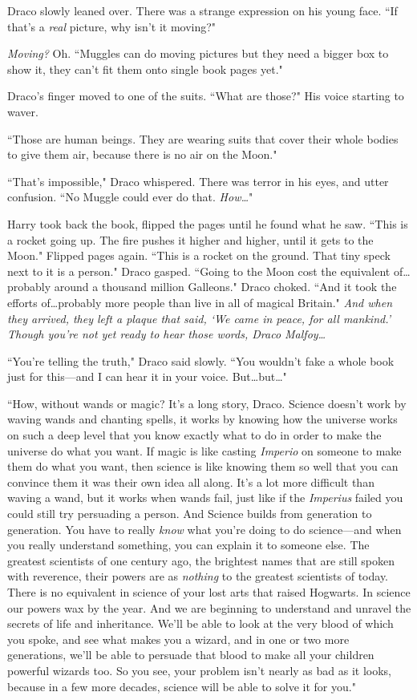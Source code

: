 Draco slowly leaned over. There was a strange expression on his young face. ``If that's a \emph{real} picture, why isn't it moving?"

\emph{Moving?} Oh. ``Muggles can do moving pictures but they need a bigger box to show it, they can't fit them onto single book pages yet."

Draco's finger moved to one of the suits. ``What are those?" His voice starting to waver.

``Those are human beings. They are wearing suits that cover their whole bodies to give them air, because there is no air on the Moon."

``That's impossible," Draco whispered. There was terror in his eyes, and utter confusion. ``No Muggle could ever do that. \emph{How…}"

Harry took back the book, flipped the pages until he found what he saw. ``This is a rocket going up. The fire pushes it higher and higher, until it gets to the Moon." Flipped pages again. ``This is a rocket on the ground. That tiny speck next to it is a person." Draco gasped. ``Going to the Moon cost the equivalent of…probably around a thousand million Galleons." Draco choked. ``And it took the efforts of…probably more people than live in all of magical Britain." \emph{And when they arrived, they left a plaque that said, `We came in peace, for all mankind.' Though you're not yet ready to hear those words, Draco Malfoy…}

``You're telling the truth," Draco said slowly. ``You wouldn't fake a whole book just for this—and I can hear it in your voice. But…but…"

``How, without wands or magic? It's a long story, Draco. Science doesn't work by waving wands and chanting spells, it works by knowing how the universe works on such a deep level that you know exactly what to do in order to make the universe do what you want. If magic is like casting \emph{Imperio} on someone to make them do what you want, then science is like knowing them so well that you can convince them it was their own idea all along. It's a lot more difficult than waving a wand, but it works when wands fail, just like if the \emph{Imperius} failed you could still try persuading a person. And Science builds from generation to generation. You have to really \emph{know} what you're doing to do science—and when you really understand something, you can explain it to someone else. The greatest scientists of one century ago, the brightest names that are still spoken with reverence, their powers are as \emph{nothing} to the greatest scientists of today. There is no equivalent in science of your lost arts that raised Hogwarts. In science our powers wax by the year. And we are beginning to understand and unravel the secrets of life and inheritance. We'll be able to look at the very blood of which you spoke, and see what makes you a wizard, and in one or two more generations, we'll be able to persuade that blood to make all your children powerful wizards too. So you see, your problem isn't nearly as bad as it looks, because in a few more decades, science will be able to solve it for you."

